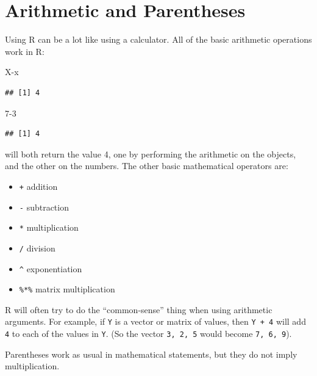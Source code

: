 \documentclass[
]{book}
\newenvironment{Shaded}{\begin{snugshade}}{\end{snugshade}}
\newcommand{\DecValTok}[1]{\textcolor[rgb]{0.00,0.00,0.81}{#1}}
\newcommand{\NormalTok}[1]{#1}
\newcommand{\SpecialCharTok}[1]{\textcolor[rgb]{0.00,0.00,0.00}{#1}}
\providecommand{\tightlist}{%
  \setlength{\itemsep}{0pt}\setlength{\parskip}{0pt}}
\begin{document}
\hypertarget{arithmetic-and-parentheses}{%
\section{Arithmetic and Parentheses}\label{arithmetic-and-parentheses}}

Using R can be a lot like using a calculator. All of the basic arithmetic operations work in R:

\begin{Shaded}
\begin{Highlighting}[]
\NormalTok{X}\SpecialCharTok{{-}}\NormalTok{x}
\end{Highlighting}
\end{Shaded}

\begin{verbatim}
## [1] 4
\end{verbatim}

\begin{Shaded}
\begin{Highlighting}[]
\DecValTok{7{-}3}
\end{Highlighting}
\end{Shaded}

\begin{verbatim}
## [1] 4
\end{verbatim}

will both return the value 4, one by performing the arithmetic on the objects, and the other on the numbers. The other basic mathematical operators are:

\begin{itemize}
\tightlist
\item
  \texttt{+} addition
\item
  \texttt{-} subtraction
\item
  \texttt{*} multiplication
\item
  \texttt{/} division
\item
  \texttt{\^{}} exponentiation
\item
  \texttt{\%*\%} matrix multiplication
\end{itemize}

R will often try to do the ``common-sense'' thing when using arithmetic arguments. For example, if \texttt{Y} is a vector or matrix of values, then \texttt{Y\ +\ 4} will add \texttt{4} to each of the values in \texttt{Y}. (So the vector \texttt{3,\ 2,\ 5} would become \texttt{7,\ 6,\ 9}).

Parentheses work as usual in mathematical statements, but they do not imply multiplication.
\end{document}
